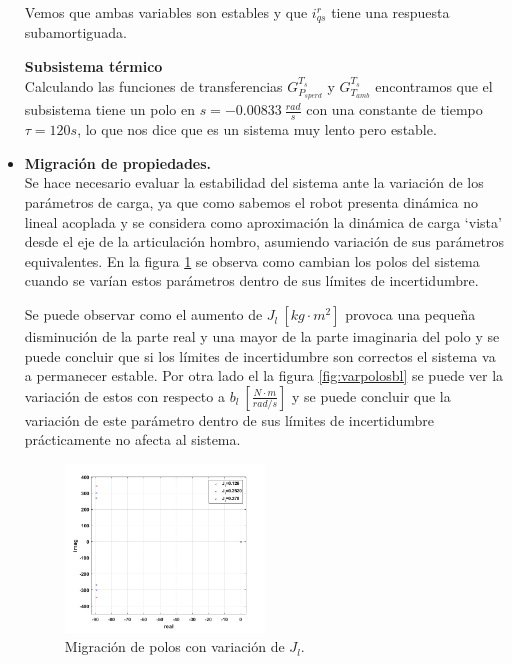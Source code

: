 \documentclass[10pt]{article}
\begin{document}
\begin{itemize}
Vemos que ambas variables son estables y que $i^{r}_{qs}$ tiene una respuesta subamortiguada.

\vspace{0.2cm}
\subitem \textbf{Subsistema térmico}\vspace{0.2cm} \\
Calculando las funciones de transferencias  $G^{T_{s}}_{P_{s perd}}$ y $G^{T_{s}}_{T_{amb}}$ encontramos que el subsistema tiene un polo en $s=-0.00833\ \frac{rad}{s}$ con una constante de tiempo $\tau=120 s$, lo que nos dice que es un sistema muy lento pero estable.
\newpage
\item \textbf{Migración de propiedades.}\vspace{0.2cm}\\
Se hace necesario evaluar la estabilidad del sistema ante la variación de los parámetros de carga, ya que como sabemos el robot presenta dinámica no lineal acoplada y se considera como aproximación la dinámica de carga `vista' desde el eje de la articulación hombro, asumiendo variación de sus parámetros equivalentes. En la figura \ref{fig:varpolos} se observa como cambian los polos del sistema cuando se varían estos parámetros dentro de sus límites de incertidumbre.

	Se puede observar como el aumento de $J_{l}\ [kg\cdot m^2]$ provoca una pequeña disminución de la parte real y una mayor de la parte imaginaria del polo y se puede concluir que si los límites de incertidumbre son correctos el sistema va a permanecer estable. Por otra lado el la figura \ref{fig:varpolosbl} se puede ver la variación de estos con respecto a $b_{l}\ [\frac{N\cdot m}{rad/s}]$ y se puede concluir que la variación de este parámetro dentro de sus límites de incertidumbre prácticamente no afecta al sistema.
	
	\begin{figure}[h!]
	\centering
	\includegraphics[width=0.5\textwidth]{varpolos.png}
	\caption{\label{fig:varpolos} Migración de polos con variación de $J_{l}$.}
	\end{figure}
	

\end{itemize}
\end{document}
